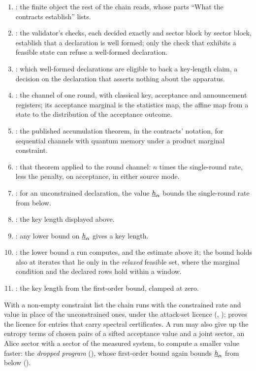 \begin{enumerate}[itemsep=1pt]
\item {}: the finite object the rest of
  the chain reads, whose parts ``What the contracts establish'' lists.
\item {}: the validator's
  checks, each decided exactly and sector block by sector block, establish
  that a declaration is well formed; only the check that exhibits a feasible
  state can refuse a well-formed declaration.
\item {}: which well-formed declarations are
  eligible to back a key-length claim, a decision on the declaration that
  asserts nothing about the apparatus.
\item {}: the channel of one round, with
  classical key, acceptance and announcement registers; its acceptance
  marginal is the statistics map, the affine map from a state to the
  distribution of the acceptance outcome.
\item {}: the published accumulation theorem, in the
  contracts' notation, for sequential channels with quantum memory under a
  product marginal constraint.
\item {}: that theorem applied to the
  round channel: $n$ times the single-round rate, less the penalty, on
  acceptance, in either source mode.
\item {}: for an unconstrained declaration, the
  value $\underline{h}_{\alpha}$ bounds the single-round rate from below.
\item {}: the key length displayed above.
\item {}: any lower bound on $\underline{h}_{\alpha}$ gives
  a key length.
\item {}: the lower bound a run
  computes, and the estimate above it; the bound holds also at iterates that
  lie only in the \emph{relaxed} feasible set, where the marginal condition
  and the declared rows hold within a window.
\item {}: the key length from the
  first-order bound, clamped at zero.
\end{enumerate}
With a non-empty constraint list the chain runs with the constrained rate and
value in place of the unconstrained ones, under the attack-set licence
(,
); 
proves the licence for entries that carry spectral certificates. A run may
also give up the entropy terms of chosen pairs of a sifted acceptance value
and a joint sector, an Alice sector with a sector of the measured system, to
compute a smaller value faster: the \emph{dropped program}
(), whose first-order bound again bounds $\underline{h}_{\alpha}$
from below ().

